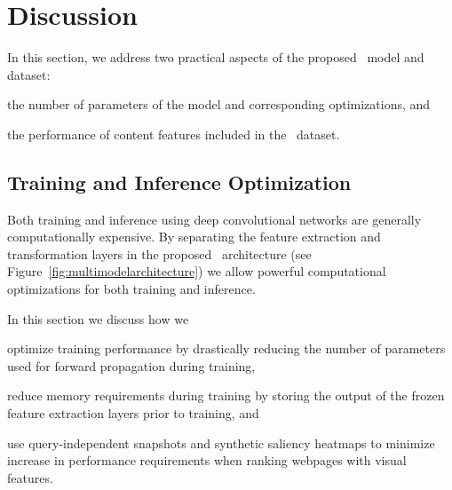 
\section{Discussion}
\label{sec:discussion}
In this section, we address two practical aspects of the proposed \modelname~model and dataset:
\begin{inparaenum}[(i)]
    \item the number of parameters of the \modelname{} model and corresponding optimizations, and
    \item the performance of content features included in the \datasetname~dataset.
\end{inparaenum}


\subsection{Training and Inference Optimization} \label{sec:sectionoptimalization}
Both training and inference using deep convolutional networks are generally computationally expensive.
By separating the feature extraction and transformation layers in the proposed \modelname~architecture (see Figure~\ref{fig:multimodelarchitecture}) we allow powerful computational optimizations for both training and inference. 

In this section we discuss how we 
\begin{inparaenum}[(i)]
    \item optimize training performance by drastically reducing the number of parameters used for forward propagation during training, 
    \item reduce memory requirements during training by storing the output of the frozen feature extraction layers prior to training, and
    \item use query-independent snapshots and synthetic saliency heatmaps to minimize increase in performance requirements when ranking webpages with visual features.
\end{inparaenum}
\fi

